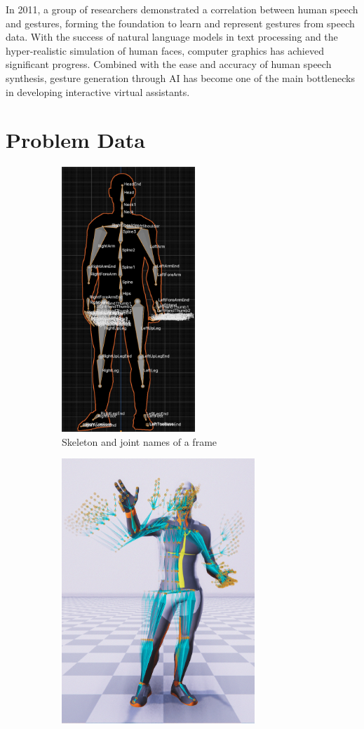 In 2011, a group of researchers \cite{bergmann2011relation} demonstrated a correlation between human speech and gestures, forming the foundation to learn and represent gestures from speech data. With the success of natural language models in text processing and the hyper-realistic simulation of human faces, computer graphics has achieved significant progress. Combined with the ease and accuracy of human speech synthesis, gesture generation through AI has become one of the main bottlenecks in developing interactive virtual assistants.

\section{Problem Data}
\label{sec:Data}

\begin{figure}[H]
	\centering
	\begin{subfigure}{0.49\textwidth}
		\centering
		\includegraphics[height=10cm]{images/Skeleton.png}
		\caption{\small Skeleton and joint names of a frame}
		\label{fig:Skeleton}
	\end{subfigure}
	\hfill
	\begin{subfigure}{0.49\textwidth}
		\centering
		\includegraphics[height=10cm]{images/MotionPastAndFuture.png}

\end{subfigure}
\end{figure}
